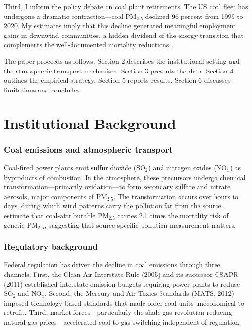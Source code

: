 \documentclass[12pt]{article}
\begin{document}
Third, I inform the policy debate on coal plant retirements. The US coal fleet has undergone a dramatic contraction---coal PM$_{2.5}$ declined 96 percent from 1999 to 2020. My estimates imply that this decline generated meaningful employment gains in downwind communities, a hidden dividend of the energy transition that complements the well-documented mortality reductions \citep{henneman2023mortality, holland2016environmental}.

The paper proceeds as follows. Section 2 describes the institutional setting and the atmospheric transport mechanism. Section 3 presents the data. Section 4 outlines the empirical strategy. Section 5 reports results. Section 6 discusses limitations and concludes.

\section{Institutional Background}

\subsubsection*{Coal emissions and atmospheric transport} Coal-fired power plants emit sulfur dioxide (SO$_2$) and nitrogen oxides (NO$_x$) as byproducts of combustion. In the atmosphere, these precursors undergo chemical transformation---primarily oxidation---to form secondary sulfate and nitrate aerosols, major components of PM$_{2.5}$. The transformation occurs over hours to days, during which wind patterns carry the pollution far from the source. \citet{henneman2023mortality} estimate that coal-attributable PM$_{2.5}$ carries 2.1 times the mortality risk of generic PM$_{2.5}$, suggesting that source-specific pollution measurement matters.

\subsubsection*{Regulatory background} Federal regulation has driven the decline in coal emissions through three channels. First, the Clean Air Interstate Rule (2005) and its successor CSAPR (2011) established interstate emission budgets requiring power plants to reduce SO$_2$ and NO$_x$. Second, the Mercury and Air Toxics Standards (MATS, 2012) imposed technology-based standards that made older coal units uneconomical to retrofit. Third, market forces---particularly the shale gas revolution reducing natural gas prices---accelerated coal-to-gas switching independent of regulation.
\end{document}

